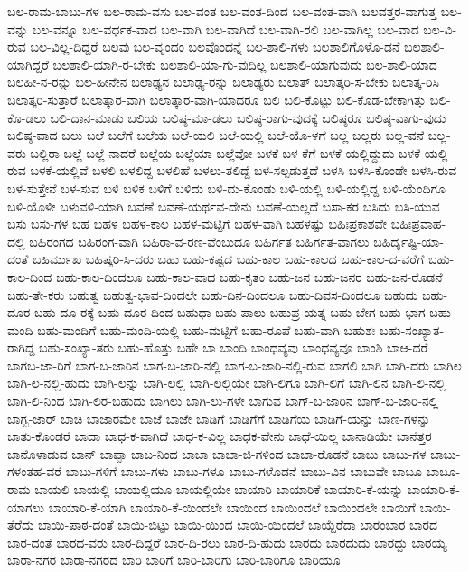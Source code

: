 {ಬಲ-ರಾಮ-ಬಾಬು-ಗಳ
ಬಲ-ರಾಮ-ವಸು
ಬಲ-ವಂತ
ಬಲ-ವಂತ-ದಿಂದ
ಬಲ-ವಂತ-ವಾಗಿ
ಬಲವತ್ತರ-ವಾಗುತ್ತ
ಬಲ-ವನ್ನು
ಬಲ-ವನ್ನೂ
ಬಲ-ವರ್ಧಕ-ವಾದ
ಬಲ-ವಾಗಿ
ಬಲ-ವಾಗಿದೆ
ಬಲ-ವಾಗಿ-ರಲಿ
ಬಲ-ವಾಗಿಲ್ಲ
ಬಲ-ವಾದ
ಬಲ-ವಿ-ರುವ
ಬಲ-ವಿಲ್ಲ-ದಿದ್ದರೆ
ಬಲವು
ಬಲ-ವೃಂದಂ
ಬಲವೊಂದನ್ನೆ
ಬಲ-ಶಾಲಿ-ಗಳು
ಬಲಶಾಲಿಗೊಳೊ-ಡನೆ
ಬಲಶಾಲಿ-ಯಾಗಿದ್ದರೆ
ಬಲಶಾಲಿ-ಯಾಗಿ-ರ-ಬೇಕು
ಬಲಶಾಲಿ-ಯಾ-ಗು-ವುದಿಲ್ಲ
ಬಲಶಾಲಿ-ಯಾಗುವುದು
ಬಲ-ಶಾಲಿ-ಯಾದ
ಬಲಹೀ-ನ-ರನ್ನು
ಬಲ-ಹೀನೇನ
ಬಲಾಢ್ಯನ
ಬಲಾಢ್ಯ-ರನ್ನು
ಬಲಾಢ್ಯರು
ಬಲಾತ್
ಬಲಾತ್ಕರಿ-ಸ-ಬೇಕು
ಬಲಾತ್ಕ-ರಿಸಿ
ಬಲಾತ್ಕರಿ-ಸುತ್ತಾರೆ
ಬಲಾತ್ಕಾರ-ವಾಗಿ
ಬಲಾತ್ಕಾರ-ವಾಗಿ-ಯಾದರೂ
ಬಲಿ
ಬಲಿ-ಕೊಟ್ಟು
ಬಲಿ-ಕೊಡ-ಬೇಕಾಗಿತ್ತು
ಬಲಿ-ಕೊ-ಡಲು
ಬಲಿ-ದಾನ-ಮಾಡು
ಬಲಿಯ
ಬಲಿಷ್ಠ-ಮಾ-ಡಲು
ಬಲಿಷ್ಠ-ರಾಗು-ವುದಕ್ಕೆ
ಬಲಿಷ್ಠರೂ
ಬಲಿಷ್ಠ-ವಾಗು-ವುದು
ಬಲಿಷ್ಠ-ವಾದ
ಬಲು
ಬಲೆ
ಬಲೆಗೆ
ಬಲೆಯ
ಬಲೆ-ಯಲಿ
ಬಲೆ-ಯಲ್ಲಿ
ಬಲೆ-ಯೊ-ಳಗೆ
ಬಲ್ಲ
ಬಲ್ಲರು
ಬಲ್ಲ-ವನೆ
ಬಲ್ಲ-ವರು
ಬಲ್ಲಿರಾ
ಬಲ್ಲೆ
ಬಲ್ಲೆ-ನಾದರೆ
ಬಲ್ಲೆಯ
ಬಲ್ಲೆಯಾ
ಬಲ್ಲೆವೋ
ಬಳಕೆ
ಬಳ-ಕೆಗೆ
ಬಳಕೆ-ಯಲ್ಲಿದ್ದುದು
ಬಳಕೆ-ಯಲ್ಲಿ-ರುವ
ಬಳಕೆ-ಯಲ್ಲಿವೆ
ಬಳಲಿ
ಬಳಲಿದ್ದ
ಬಳಲಿಹೆ
ಬಳಲು-ತಲಿದ್ದೆ
ಬಳ-ಸಲ್ಪಡುತ್ತದೆ
ಬಳಸಿ
ಬಳಸಿ-ಕೊಂಡೇ
ಬಳಸಿ-ರುವ
ಬಳ-ಸುತ್ತೇನೆ
ಬಳ-ಸುವ
ಬಳಿ
ಬಳಿಕ
ಬಳಿಗೆ
ಬಳಿದು
ಬಳಿ-ದು-ಕೊಂಡು
ಬಳಿ-ಯಲ್ಲಿ
ಬಳಿ-ಯಲ್ಲಿದ್ದ
ಬಳಿ-ಯೆಂದಿಗೂ
ಬಳಿ-ಯೊಳೀ
ಬಳುವಳಿ-ಯಾಗಿ
ಬವಣೆ
ಬವಣೆ-ಯರ್ಥವ-ದೇನು
ಬವಣೆ-ಯಲ್ಲದೆ
ಬಸಾ-ಕರ
ಬಸಿದು
ಬಸಿ-ಯುವ
ಬಸು
ಬಸು-ಗಳ
ಬಹ
ಬಹಳ
ಬಹಳ-ಕಾಲ
ಬಹಳ-ಮಟ್ಟಿಗೆ
ಬಹಳ-ವಾಗಿ
ಬಹಳಷ್ಟು
ಬಹಿಃಪ್ರಕಾಶವೇ
ಬಹಿಃಪ್ರವಾಹ-ದಲ್ಲಿ
ಬಹಿರಂಗದ
ಬಹಿರಂಗ-ವಾಗಿ
ಬಹಿರಾ-ವ-ರಣ-ವೆಂಬುದೂ
ಬಹಿರ್ಗತ
ಬಹಿರ್ಗತ-ವಾಗಲು
ಬಹಿರ್ದೃಷ್ಟಿ-ಯಾ-ದಂತೆ
ಬಹಿರ್ಮುಖ
ಬಹಿಷ್ಕರಿ-ಸಿ-ದರು
ಬಹು
ಬಹು-ಕಷ್ಟದ
ಬಹು-ಕಾಲ
ಬಹು-ಕಾಲದ
ಬಹು-ಕಾಲ-ದ-ವರೆಗೆ
ಬಹು-ಕಾಲ-ದಿಂದ
ಬಹು-ಕಾಲ-ದಿಂದಲೂ
ಬಹು-ಕಾಲ-ವಾದ
ಬಹು-ಕೃತಂ
ಬಹು-ಜನ
ಬಹು-ಜನರ
ಬಹು-ಜನ-ರೊಡನೆ
ಬಹು-ತೇ-ಕರು
ಬಹುತ್ವ
ಬಹುತ್ವ-ಭಾವ-ದಿಂದಲೇ
ಬಹು-ದಿನ-ದಿಂದಲೂ
ಬಹು-ದಿವಸ-ದಿಂದಲೂ
ಬಹುದು
ಬಹು-ದೂರ
ಬಹು-ದೂ-ರಕ್ಕೆ
ಬಹು-ದೂರ-ದಿಂದ
ಬಹುಧಾ
ಬಹು-ಪಾಲು
ಬಹುಪ್ರ-ಯತ್ನ
ಬಹು-ಬೇಗ
ಬಹು-ಭಾಗ
ಬಹು-ಮಂದಿ
ಬಹು-ಮಂದಿಗೆ
ಬಹು-ಮಂದಿ-ಯಲ್ಲಿ
ಬಹು-ಮಟ್ಟಿಗೆ
ಬಹು-ರೂಪೆ
ಬಹು-ವಾಗಿ
ಬಹುಶಃ
ಬಹು-ಸಂಖ್ಯಾತ-ರಾಗಿದ್ದ
ಬಹು-ಸಂಖ್ಯಾ-ತರು
ಬಹು-ಹೊತ್ತು
ಬಹೇ
ಬಾ
ಬಾಂದಿ
ಬಾಂಧವ್ಯವು
ಬಾಂಧವ್ಯವೂ
ಬಾಂಶಿ
ಬಾಆ-ದರೆ
ಬಾಗಬ-ಜಾ-ರಿಗೆ
ಬಾಗ-ಬ-ಜಾರಿನ
ಬಾಗ-ಬ-ಜಾರಿ-ನಲ್ಲಿ
ಬಾಗ-ಬ-ಜಾರಿ-ನಲ್ಲಿ-ರುವ
ಬಾಗಲಿ
ಬಾಗಿ
ಬಾಗಿ-ದರು
ಬಾಗಿಲ
ಬಾಗಿ-ಲ-ನಲ್ಲಿ-ಹುದು
ಬಾಗಿ-ಲನ್ನು
ಬಾಗಿ-ಲಲ್ಲಿ
ಬಾಗಿ-ಲಲ್ಲಿಯೇ
ಬಾಗಿ-ಲಿಗೂ
ಬಾಗಿ-ಲಿಗೆ
ಬಾಗಿ-ಲಿನ
ಬಾಗಿ-ಲಿ-ನಲ್ಲಿ
ಬಾಗಿ-ಲಿ-ನಿಂದ
ಬಾಗಿ-ಲಿರ-ಬಹುದು
ಬಾಗಿಲು
ಬಾಗಿ-ಲು-ಗಳೇ
ಬಾಗುವ
ಬಾಗ್-ಬ-ಜಾರಿನ
ಬಾಗ್-ಬ-ಜಾರಿ-ನಲ್ಲಿ
ಬಾಗ್ಬ-ಜಾರ್
ಬಾಚಿ
ಬಾಜಾರಮೇ
ಬಾಜೆ
ಬಾಜೇ
ಬಾಡಿಗೆ
ಬಾಡಿಗೆಗೆ
ಬಾಡಿಗೆಯ
ಬಾಡಿಗೆ-ಯನ್ನು
ಬಾಣ-ಗಳನ್ನು
ಬಾತು-ಕೊಂಡರೆ
ಬಾದಾ
ಬಾಧ-ಕ-ವಾಗಿದೆ
ಬಾಧ-ಕ-ವಿಲ್ಲ
ಬಾಧಕ-ವೇನು
ಬಾಧೆ-ಯಿಲ್ಲ
ಬಾನಾಡಿಯೇ
ಬಾನೆತ್ತರ
ಬಾನೊಳಾಡುವ
ಬಾನ್
ಬಾಪ್ಪಾ
ಬಾಬ-ನಿಂದ
ಬಾಬಾ
ಬಾಬಾ-ಜಿ-ಗಳಿಂದ
ಬಾಬಾ-ರೊಡನೆ
ಬಾಬು
ಬಾಬು-ಗಳ
ಬಾಬು-ಗಳಂತಹ-ವರೆ
ಬಾಬು-ಗಳಿಗೆ
ಬಾಬು-ಗಳು
ಬಾಬು-ಗಳೂ
ಬಾಬು-ಗಳೊಡನೆ
ಬಾಬು-ವಿನ
ಬಾಬುವೇ
ಬಾಬೂ
ಬಾಬೂ-ರಾಮ
ಬಾಯಲಿ
ಬಾಯಲ್ಲಿ
ಬಾಯಲ್ಲಿಯೂ
ಬಾಯಲ್ಲಿಯೇ
ಬಾಯಾರಿ
ಬಾಯಾರಿಕೆ
ಬಾಯಾರಿ-ಕೆ-ಯನ್ನು
ಬಾಯಾರಿ-ಕೆ-ಯಾಗಲು
ಬಾಯಾರಿ-ಕೆ-ಯಾಗಿ
ಬಾಯಾರಿ-ಕೆ-ಯಿಂದಲೇ
ಬಾಯಿಂದ
ಬಾಯಿಂದಲೆ
ಬಾಯಿಂದಲೇ
ಬಾಯಿಗೆ
ಬಾಯಿ-ತೆರೆದು
ಬಾಯಿ-ಪಾಠ-ದಂತೆ
ಬಾಯಿ-ಬಿಟ್ಟು
ಬಾಯಿ-ಯಿಂದ
ಬಾಯಿ-ಯಿಂದಲೆ
ಬಾಯ್ದೆರೆದಾ
ಬಾರಂಬಾರ
ಬಾರದ
ಬಾರ-ದಂತೆ
ಬಾರದ-ವರು
ಬಾರ-ದಿದ್ದರೆ
ಬಾರ-ದಿ-ರಲು
ಬಾರ-ದಿ-ಹುದು
ಬಾರದು
ಬಾರದುದು
ಬಾರದ್ದು
ಬಾರಯ್ಯ
ಬಾರಾ-ನಗರ
ಬಾರಾ-ನಗರದ
ಬಾರಿ
ಬಾರಿಗೆ
ಬಾರಿ-ಬಾರಿಗು
ಬಾರಿ-ಬಾರಿಗೂ
ಬಾರಿಯೂ
}
